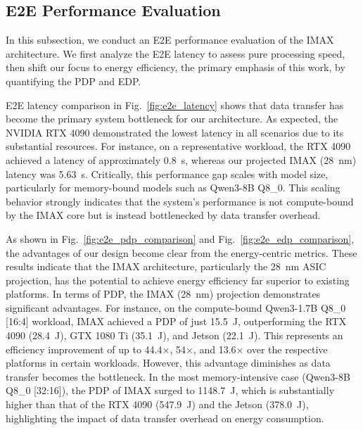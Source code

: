 \subsection{E2E Performance Evaluation}
In this subsection, we conduct an E2E performance evaluation of the IMAX architecture. 
We first analyze the E2E latency to assess pure processing speed, then shift our focus to energy efficiency, the primary emphasis of this work, by quantifying the PDP and EDP.


E2E latency comparison in Fig.~\ref{fig:e2e_latency} shows that data transfer has become the primary system bottleneck for our architecture. 
As expected, the NVIDIA RTX 4090 demonstrated the lowest latency in all scenarios due to its substantial resources. 
For instance, on a representative workload, the RTX 4090 achieved a latency of approximately \SI{0.8}{\second}, whereas our projected IMAX (\SI{28}{\nano\meter}) latency was \SI{5.63}{\second}.
Critically, this performance gap scales with model size, particularly for memory-bound models such as Qwen3-8B Q8\_0. 
This scaling behavior strongly indicates that the system's performance is not compute-bound by the IMAX core but is instead bottlenecked by data transfer overhead.


As shown in Fig.~\ref{fig:e2e_pdp_comparison} and Fig.~\ref{fig:e2e_edp_comparison}, the advantages of our design become clear from the energy-centric metrics.
These results indicate that the IMAX architecture, particularly the \SI{28}{\nano\meter} ASIC projection, has the potential to achieve energy efficiency far superior to existing platforms. 
In terms of PDP, the IMAX (\SI{28}{\nano\meter}) projection demonstrates significant advantages. 
For instance, on the compute-bound Qwen3-1.7B Q8\_0 [16:4] workload, IMAX achieved a PDP of just \SI{15.5}{\joule}, outperforming the RTX 4090 (\SI{28.4}{\joule}), GTX 1080 Ti (\SI{35.1}{\joule}), and Jetson (\SI{22.1}{\joule}). 
This represents an efficiency improvement of up to \num{44.4}$\times$, \num{54}$\times$, and \num{13.6}$\times$ over the respective platforms in certain workloads. 
However, this advantage diminishes as data transfer becomes the bottleneck. 
In the most memory-intensive case (Qwen3-8B Q8\_0 [32:16]), the PDP of IMAX surged to \SI{1148.7}{\joule}, which is substantially higher than that of the RTX 4090 (\SI{547.9}{\joule}) and the Jetson (\SI{378.0}{\joule}), highlighting the impact of data transfer overhead on energy consumption.



